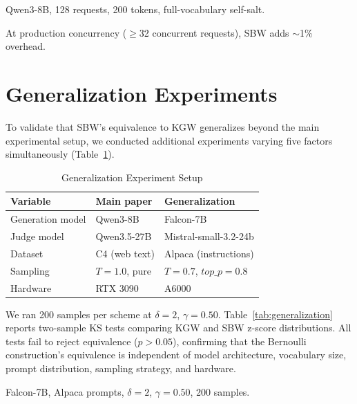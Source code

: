 \documentclass[11pt]{article}
\begin{document}
\begin{table}[h]
\caption{vLLM Serving Overhead}
\label{tab:vllm_overhead}
\begin{center}
\footnotesize

\end{center}
\vspace{-2mm}
{\small Qwen3-8B, 128 requests, 200 tokens, full-vocabulary self-salt.}
\end{table}

At production concurrency ($\geq$32 concurrent requests), SBW adds ${\sim}$1\% overhead.

\section{Generalization Experiments}
\label{app:generalization}

To validate that SBW's equivalence to KGW generalizes beyond the main experimental setup, we conducted additional experiments varying five factors simultaneously (Table~\ref{tab:generalization_setup}).

\begin{table}[h]
\caption{Generalization Experiment Setup}
\label{tab:generalization_setup}
\begin{center}
\footnotesize
\begin{tabular}{@{}lll@{}}
\toprule
Variable & Main paper & Generalization \\
\midrule
Generation model & Qwen3-8B & Falcon-7B \\
Judge model & Qwen3.5-27B & Mistral-small-3.2-24b \\
Dataset & C4 (web text) & Alpaca (instructions) \\
Sampling & $T{=}1.0$, pure & $T{=}0.7$, $top\_p{=}0.8$ \\
Hardware & RTX 3090 & A6000 \\
\bottomrule
\end{tabular}
\end{center}
\end{table}

We ran 200 samples per scheme at $\delta=2$, $\gamma=0.50$. Table~\ref{tab:generalization} reports two-sample KS tests comparing KGW and SBW z-score distributions. All tests fail to reject equivalence ($p > 0.05$), confirming that the Bernoulli construction's equivalence is independent of model architecture, vocabulary size, prompt distribution, sampling strategy, and hardware.

\begin{table}[h]
\caption{Two-Sample KS Tests: KGW vs SBW on Falcon-7B}
\label{tab:generalization}
\begin{center}
\footnotesize

\end{center}
\vspace{-2mm}
{\small Falcon-7B, Alpaca prompts, $\delta=2$, $\gamma=0.50$, 200 samples.}
\end{table}
\end{document}
